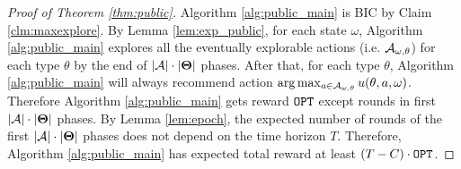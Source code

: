 \begin{proof}[Proof of Theorem \ref{thm:public}]
Algorithm \ref{alg:public_main} is BIC  by Claim \ref{clm:maxexplore}. By Lemma \ref{lem:exp_public}, for each state $\omega$, Algorithm \ref{alg:public_main} explores all the eventually explorable actions (i.e. $\mathcal{A}_{\omega,\theta}$) for each type $\theta$ by the end of $|\mathcal{A}|\cdot |\bold{\Theta}|$ phases. After that, for each type $\theta$, Algorithm \ref{alg:public_main} will always recommend action $ \arg\max_{a \in \mathcal{A}_{\omega,\theta}} u(\theta, a, \omega)$. Therefore Algorithm \ref{alg:public_main} gets reward $\mathtt{OPT}$ except rounds in first $|\mathcal{A}|\cdot |\bold{\Theta}|$ phases. By Lemma \ref{lem:epoch}, the expected number of rounds of the first  $|\mathcal{A}|\cdot |\bold{\Theta}|$ phases does not depend on the time horizon $T$. Therefore, Algorithm \ref{alg:public_main} has expected total reward at least  $\left(T - C \right) \cdot \mathtt{OPT}$.
\end{proof} 
